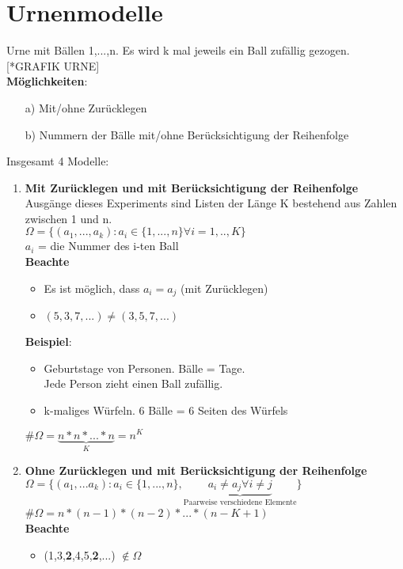 \section{Urnenmodelle}
Urne mit Bällen 1,...,n. Es wird k mal jeweils ein Ball zufällig gezogen. [*GRAFIK URNE]\\
\textbf{Möglichkeiten}:
\begin{enumerate}
	\item[a)] Mit/ohne Zurücklegen
	\item[b)] Nummern der Bälle mit/ohne Berücksichtigung der Reihenfolge
\end{enumerate}
Insgesamt 4 Modelle:
\begin{enumerate}
	\item \textbf{Mit Zurücklegen und mit Berücksichtigung der Reihenfolge}\\
	Ausgänge dieses Experiments sind Listen der Länge K bestehend aus Zahlen zwischen 1 und n.\\
	$\Omega=\{(a_1,...,a_k):a_i \in \{1,...,n\} \forall i = 1,..,K\}$\\
	$a_i$ = die Nummer des i-ten Ball\smallskip\\
	\textbf{Beachte}
	\begin{itemize}
		\item 	Es ist möglich, dass $a_i = a_j$ (mit Zurücklegen)
		\item 	$(5,3,7,...) \neq (3,5,7,...)$
	\end{itemize}
	\textbf{Beispiel}:
	\begin{itemize}
		\item Geburtstage von Personen. Bälle = Tage. \\Jede Person zieht einen Ball zufällig.
		\item k-maliges Würfeln. 6 Bälle = 6 Seiten des Würfels\\
	\end{itemize}
	$\#\Omega = \underbrace{n * n * ... * n}_K = n^K$
	\item \textbf{Ohne Zurücklegen und mit Berücksichtigung der Reihenfolge}\\
	$\Omega=\{(a_1,...a_k):a_i \in \{1,...,n\},\underbrace{a_i \neq a_j\forall i\neq j}_\text{Paarweise verschiedene Elemente} \}$\smallskip\\
	\#$\Omega = n* (n-1)*(n-2)*...*(n-K+1)$\smallskip\\
	\textbf{Beachte}
	\begin{itemize}
		\item (1,3,\textbf{2},4,5,\textbf{2},...) $\notin \Omega$

\end{itemize}
\end{enumerate}
